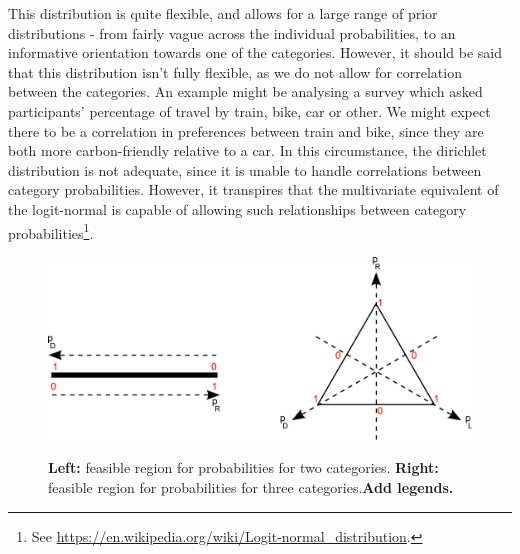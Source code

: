 \documentclass[11pt,fullpage]{book}
\begin{document}
This distribution is quite flexible, and allows for a large range of prior distributions - from fairly vague across the individual probabilities, to an informative orientation towards one of the categories. However, it should be said that this distribution isn't fully flexible, as we do not allow for correlation between the categories. An example might be analysing a survey which asked participants' percentage of travel by train, bike, car or other. We might expect there to be a correlation in preferences between train and bike, since they are both more carbon-friendly relative to a car. In this circumstance, the dirichlet distribution is not adequate, since it is unable to handle correlations between category probabilities. However, it transpires that the multivariate equivalent of the logit-normal is capable of allowing such relationships between category probabilities\footnote{See \url{https://en.wikipedia.org/wiki/Logit-normal\_distribution}.}.

\begin{figure}
\centering
\scalebox{0.5} 
{\includegraphics{Distributions_dirichlet.pdf}}
\caption{\textbf{Left:} feasible region for probabilities for two categories. \textbf{Right:} feasible region for probabilities for three categories.\textbf{Add legends.}}\label{fig:Distributions_dirichlet}
\end{figure}
\end{document}
